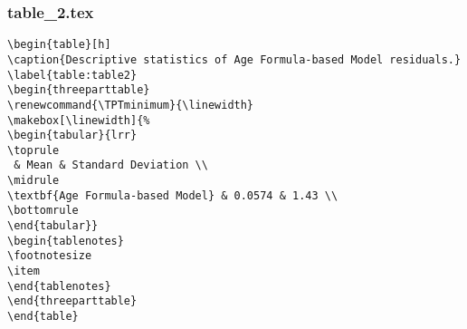 \documentclass[11pt]{article}
\begin{document}
\subsubsection*{table\_2.tex}

\begin{Verbatim}[tabsize=4]
\begin{table}[h]
\caption{Descriptive statistics of Age Formula-based Model residuals.}
\label{table:table2}
\begin{threeparttable}
\renewcommand{\TPTminimum}{\linewidth}
\makebox[\linewidth]{%
\begin{tabular}{lrr}
\toprule
 & Mean & Standard Deviation \\
\midrule
\textbf{Age Formula-based Model} & 0.0574 & 1.43 \\
\bottomrule
\end{tabular}}
\begin{tablenotes}
\footnotesize
\item
\end{tablenotes}
\end{threeparttable}
\end{table}

\end{Verbatim}
\end{document}
